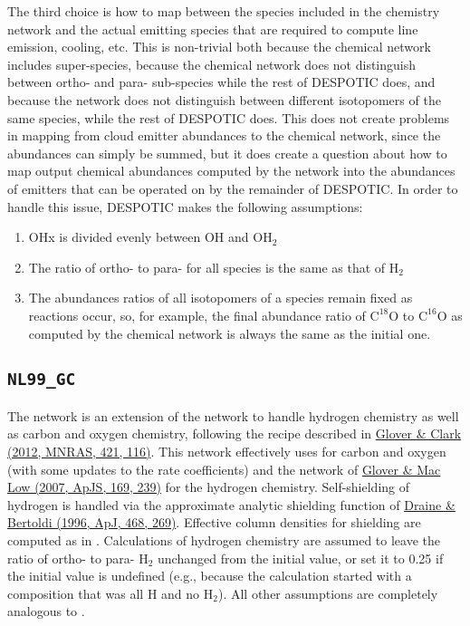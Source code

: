 \documentclass[letterpaper,10pt,english]{sphinxmanual}
\begin{document}
The third choice is how to map between the species included in the
chemistry network and the actual emitting species that are required
to compute line emission, cooling, etc. This is non-trivial both
because the chemical network includes super-species, because the
chemical network does not distinguish between ortho- and para-
sub-species while the rest of DESPOTIC does, and because the network
does not distinguish between different isotopomers of the same
species, while the rest of DESPOTIC does. This does not create
problems in mapping from cloud emitter abundances to the chemical
network, since the abundances can simply be summed, but it does create
a question about how to map output chemical abundances computed by
the network into the abundances of emitters that can be operated on by
the remainder of DESPOTIC. In order to handle this issue, DESPOTIC
makes the following assumptions:
\begin{enumerate}
\item {} 
OHx is divided evenly between OH and \(\mathrm{OH}_2\)

\item {} 
The ratio of ortho- to para- for all species is the same as that of
\(\mathrm{H}_2\)

\item {} 
The abundances ratios of all isotopomers of a species remain fixed
as reactions occur, so, for example, the final abundance ratio of
\(\mathrm{C}^{18}\mathrm{O}\) to
\(\mathrm{C}^{16}\mathrm{O}\) as computed by the chemical
network is always the same as the initial one.

\end{enumerate}


\subsection{\texttt{NL99\_GC}}
\label{chemistry:sssec-nl99-gc}\label{chemistry:nl99-gc}
The  network is an extension of the  network to
handle hydrogen chemistry as well as carbon and oxygen chemistry,
following the recipe described in \href{http://adsabs.harvard.edu/abs/2012MNRAS.421..116G}{Glover \& Clark (2012, MNRAS,
421, 116)}. This
network effectively uses  for carbon and oxygen (with some
updates to the rate coefficients) and the network of \href{http://adsabs.harvard.edu/abs/2007ApJS..169..239G}{Glover \& Mac Low
(2007, ApJS, 169, 239)}
for the hydrogen chemistry. Self-shielding of hydrogen is handled via
the approximate analytic shielding function of \href{http://adsabs.harvard.edu/abs/1996ApJ...468..269D}{Draine \& Bertoldi
(1996, ApJ, 468, 269)}. Effective
column densities for shielding are computed as in .
Calculations of hydrogen chemistry are assumed to leave the ratio of
ortho- to para- \(\mathrm{H}_2\) unchanged from the initial value,
or set it to 0.25 if the initial value is undefined (e.g., because the
calculation started with a composition that was all H and no
\(\mathrm{H}_2\)). All other assumptions are completely analogous
to .
\end{document}
